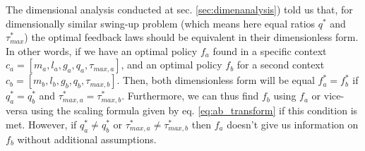 The dimensional analysis conducted at sec. \ref{sec:dimenanalysis}) told us that, for dimensionally similar swing-up problem (which means here equal ratios $q^*$ and $\tau_{max}^*$) the optimal feedback laws should be equivalent in their dimensionless form. In other words, if we have an optimal policy $f_a$ found in a specific context $c_a = [m_a,l_a,g_a,q_a,\tau_{max,a}]$, and an optimal policy $f_b$ for a second context $c_b = [m_b,l_b,g_b,q_b,\tau_{max,b}]$. Then, both dimensionless form will be equal $f_a^*=f_b^*$ if $q^*_a = q^*_b$ and $\tau_{max,a}^* = \tau_{max,b}^*$. Furthermore, we can thus find $f_b$ using $f_a$ or vice-versa using the scaling formula given by eq. \eqref{eq:ab_transform} if this condition is met. However, if $q^*_a \neq q^*_b$ or $\tau_{max,a}^* \neq \tau_{max,b}^*$ then $f_a$ doesn't give us information on $f_b$ without additional assumptions. 

